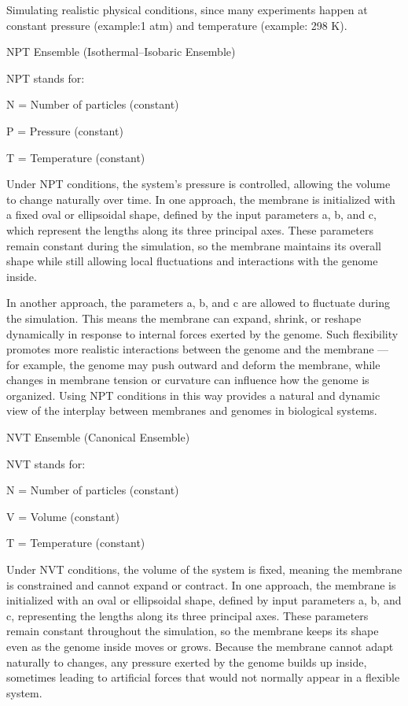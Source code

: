 \documentclass[12pt]{article}
\begin{document}
\begin{flushleft}
Simulating realistic physical conditions, since many experiments happen at constant pressure (example:1 atm) and temperature  (example: 298 K).

\noindent NPT Ensemble (Isothermal–Isobaric Ensemble)

NPT stands for:

    N = Number of particles (constant)

    P = Pressure (constant)

    T = Temperature (constant)
    
    Under NPT conditions, the system’s pressure is controlled, allowing the volume to change naturally over time. In one approach, the membrane is initialized with a fixed oval or ellipsoidal shape, defined by the input parameters a, b, and c, which represent the lengths along its three principal axes. These parameters remain constant during the simulation, so the membrane maintains its overall shape while still allowing local fluctuations and interactions with the genome inside.

In another approach, the parameters a, b, and c are allowed to fluctuate during the simulation. This means the membrane can expand, shrink, or reshape dynamically in response to internal forces exerted by the genome. Such flexibility promotes more realistic interactions between the genome and the membrane — for example, the genome may push outward and deform the membrane, while changes in membrane tension or curvature can influence how the genome is organized. Using NPT conditions in this way provides a natural and dynamic view of the interplay between membranes and genomes in biological systems.

\noindent NVT Ensemble (Canonical Ensemble)

NVT stands for:

    N = Number of particles (constant)

    V = Volume (constant)

    T = Temperature (constant)

Under NVT conditions, the volume of the system is fixed, meaning the membrane is constrained and cannot expand or contract. In one approach, the membrane is initialized with an oval or ellipsoidal shape, defined by input parameters a, b, and c, representing the lengths along its three principal axes. These parameters remain constant throughout the simulation, so the membrane keeps its shape even as the genome inside moves or grows. Because the membrane cannot adapt naturally to changes, any pressure exerted by the genome builds up inside, sometimes leading to artificial forces that would not normally appear in a flexible system.


\end{flushleft}
\end{document}
